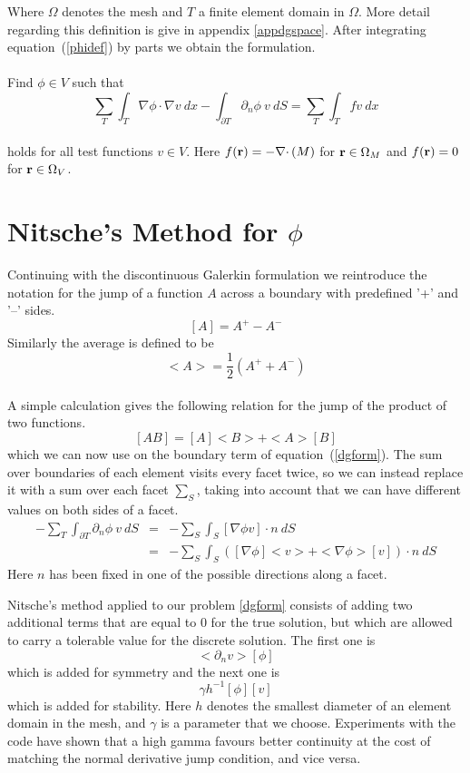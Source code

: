 \documentclass[12pt,a4paper,notitlepage]{article}
\begin{document}
\noindent Where $\Omega$ denotes the mesh and $T$ a finite element domain in $\Omega$. More detail regarding this
definition is give in appendix \ref{appdgspace}. After integrating
equation~(\ref{phidef}) by parts we obtain the formulation.
\\
\\
Find $\phi \in V$ such that
\begin{equation}\label{dgform}  
 \sum_T \int_T \nabla \phi \cdotp \nabla v \ dx - \int_{\partial T} \partial_n \phi \  v \ dS = \sum_T \int_T fv \ dx
\end{equation}
 \\
holds for all test functions $v \in V $. Here $f(\mathbf{r}) = - \nabla \cdotp (M)$ for $\mathbf{r} \in \Omega_M$ and $f(\mathbf{r}) = 0$
for $\mathbf{r} \in \Omega_V$.

\section{Nitsche's Method for $\phi$}
Continuing with the discontinuous Galerkin formulation we reintroduce the notation for the jump
of a function $A$ across a boundary with predefined '+' and '--' sides. 
\[ [A] = A^+ - A^- \]
Similarly the average is defined to be
\[ <A> = \frac{1}{2} (A^+ + A^-) \]
\\
A simple calculation gives the following relation for the jump of the product of two functions.
\[ [AB] = [A]<B> + <A>[B] \]
which we can now use on the boundary term of equation~(\ref{dgform}). The sum over boundaries of each element 
visits every facet twice, so we can instead replace it with a sum over each facet $\sum_S$, taking into account that
we can have different values on both sides of a facet. 
\begin{eqnarray*}
- \sum_T \int_{\partial T} \partial_n \phi \  v \ dS &=&  - \sum_S \int_S [\nabla \phi v ] \cdotp n \ dS \\
&=&  - \sum_S \int_S ( [\nabla \phi] <v> + <\nabla \phi> [v]) \cdotp n \ dS
\end{eqnarray*}
Here $n$ has been fixed in one of the possible directions along a facet. 

Nitsche's method applied to our problem \ref{dgform} consists of adding two additional terms that are equal to 0 
for the true solution, but which are allowed to carry a tolerable value for the discrete solution.
The first one is
\[ <\partial_n v> [\phi] \]
which is added for symmetry and the next one is
\[\gamma h^{-1} [\phi][v] \]
which is added for stability. Here $h$ denotes the smallest diameter of an element domain in the mesh, and
$\gamma$ is a parameter that we choose. Experiments with the code have shown that a high gamma favours better
continuity at the cost of matching the normal derivative jump condition, and vice versa.  
\end{document}

